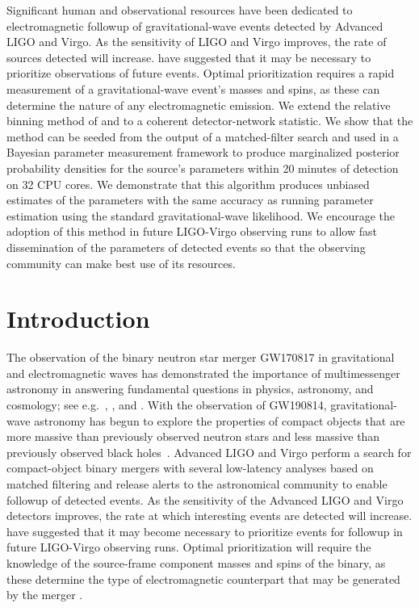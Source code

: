 Significant human and observational resources have been dedicated to electromagnetic followup of gravitational-wave events detected by Advanced LIGO and Virgo. As the sensitivity of LIGO and Virgo improves, the rate of sources detected will increase. \cite{Margalit:2019dpi} have suggested that it may be necessary to prioritize observations of future events. Optimal prioritization requires a rapid measurement of a gravitational-wave event's masses and spins, as these can determine the nature of any electromagnetic emission. We extend the relative binning method of \cite{cornish2013fast} and \cite{Zackay:2018qdy} to a coherent detector-network statistic. We show that the method can be seeded from the output of a matched-filter search and used in a Bayesian parameter measurement framework to produce marginalized posterior probability densities for the source's parameters within 20 minutes of detection on 32 CPU cores. We demonstrate that this algorithm produces unbiased estimates of the parameters with the same accuracy as running parameter estimation using the standard gravitational-wave likelihood. We encourage the adoption of this method in future LIGO-Virgo observing runs to allow fast dissemination of the parameters of detected events so that the observing community can make best use of its resources.

\section{Introduction}
The observation of the binary neutron star merger GW170817 in gravitational and electromagnetic waves \cite{TheLIGOScientific:2017qsa,GBM:2017lvd} has demonstrated the importance of multimessenger astronomy in answering fundamental questions in physics, astronomy, and cosmology; see e.g.~\cite{Monitor:2017mdv}, \cite{Lattimer:2019iye}, and \cite{Abbott:2017xzu}. With the observation of GW190814, gravitational-wave astronomy has begun to explore the properties of compact objects that are more massive than previously observed neutron stars and less massive than previously observed black holes~\cite{Abbott:2020khf}. Advanced LIGO and Virgo perform a search for compact-object binary mergers with several low-latency analyses based on matched filtering \cite{Messick:2016aqy,Nitz:2018rgo} and release alerts to the astronomical community to enable followup of detected events. As the sensitivity of the Advanced LIGO and Virgo detectors improves, the rate at which interesting events are detected will increase. \cite{Margalit:2019dpi} have suggested that it may become necessary to prioritize events for followup in future LIGO-Virgo observing runs. Optimal prioritization will require the knowledge of the source-frame component masses and spins of the binary, as these determine the type of electromagnetic counterpart that may be generated by the merger \cite{Foucart:2018rjc,Capano:2019eae}.


